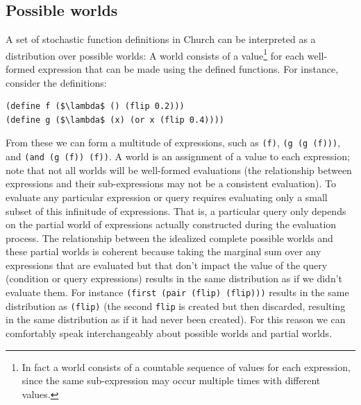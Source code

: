 \documentclass[pdfextras]{handbook}
\begin{document}
 
 
 \subsection{Possible worlds}


A set of stochastic function definitions in Church can be interpreted as a distribution over possible worlds: A world consists of a value\footnote{In fact a world consists of a countable sequence of values for each expression, since the same sub-expression may occur multiple times with different values.} for each well-formed expression that can be made using the defined functions.  For instance, consider the definitions:
\begin{lstlisting}[mathescape]
(define f ($\lambda$ () (flip 0.2)))
(define g ($\lambda$ (x) (or x (flip 0.4))))
\end{lstlisting}
From these we can form a multitude of expressions, such as \lstinline{(f)}, \lstinline{(g (g (f)))}, and \lstinline{(and (g (f)) (f))}. A world is an assignment of a value to each expression; note that not all worlds will be well-formed evaluations (the relationship between expressions and their sub-expressions may not be a consistent evaluation).
To evaluate any particular expression or query requires evaluating only a small subset of this infinitude of expressions. 
That is, a particular query only depends on the partial world of expressions actually constructed during the evaluation process. 
The relationship between the idealized complete possible worlds and these partial worlds is coherent because taking the marginal sum over any expressions that are evaluated but that don't impact the value of the query (condition or query expressions) results in the same distribution as if we didn't evaluate them. For instance \lstinline{(first (pair (flip) (flip)))} results in the same distribution as \lstinline{(flip)} (the second \lstinline{flip} is created but then discarded, resulting in the same distribution as if it had never been created).
For this reason we can comfortably speak interchangeably about possible worlds and partial worlds.
\end{document}
